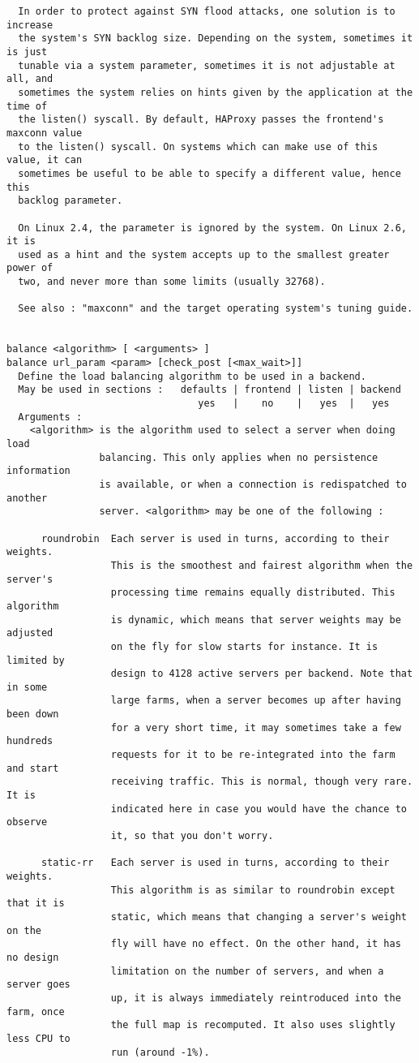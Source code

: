 \begin{verbatim}
  In order to protect against SYN flood attacks, one solution is to increase
  the system's SYN backlog size. Depending on the system, sometimes it is just
  tunable via a system parameter, sometimes it is not adjustable at all, and
  sometimes the system relies on hints given by the application at the time of
  the listen() syscall. By default, HAProxy passes the frontend's maxconn value
  to the listen() syscall. On systems which can make use of this value, it can
  sometimes be useful to be able to specify a different value, hence this
  backlog parameter.

  On Linux 2.4, the parameter is ignored by the system. On Linux 2.6, it is
  used as a hint and the system accepts up to the smallest greater power of
  two, and never more than some limits (usually 32768).

  See also : "maxconn" and the target operating system's tuning guide.


balance <algorithm> [ <arguments> ]
balance url_param <param> [check_post [<max_wait>]]
  Define the load balancing algorithm to be used in a backend.
  May be used in sections :   defaults | frontend | listen | backend
                                 yes   |    no    |   yes  |   yes
  Arguments :
    <algorithm> is the algorithm used to select a server when doing load
                balancing. This only applies when no persistence information
                is available, or when a connection is redispatched to another
                server. <algorithm> may be one of the following :

      roundrobin  Each server is used in turns, according to their weights.
                  This is the smoothest and fairest algorithm when the server's
                  processing time remains equally distributed. This algorithm
                  is dynamic, which means that server weights may be adjusted
                  on the fly for slow starts for instance. It is limited by
                  design to 4128 active servers per backend. Note that in some
                  large farms, when a server becomes up after having been down
                  for a very short time, it may sometimes take a few hundreds
                  requests for it to be re-integrated into the farm and start
                  receiving traffic. This is normal, though very rare. It is
                  indicated here in case you would have the chance to observe
                  it, so that you don't worry.

      static-rr   Each server is used in turns, according to their weights.
                  This algorithm is as similar to roundrobin except that it is
                  static, which means that changing a server's weight on the
                  fly will have no effect. On the other hand, it has no design
                  limitation on the number of servers, and when a server goes
                  up, it is always immediately reintroduced into the farm, once
                  the full map is recomputed. It also uses slightly less CPU to
                  run (around -1%).


\end{verbatim}
